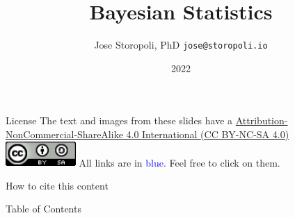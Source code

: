 \documentclass[aspectratio=169]{beamer}                    %
\title[Bayesian Statistics]{Bayesian Statistics}
\author{Jose Storopoli, PhD \texttt{jose@storopoli.io}}
\institute{}
\date{2022}
\begin{document}

\maketitle

\begingroup
\AtBeginSection[]{}

\endgroup

\begin{frame}{License}
	\centering
	\vfill
	\Large The text and images from these slides have a
	\href{https://creativecommons.org/licenses/by-nc-sa/4.0/deed.en}{Attribution-NonCommercial-ShareAlike 4.0 International (CC BY-NC-SA 4.0)}
	\vfill
	\includegraphics[width = 0.2\textwidth]{CC_SA.png}
	\vfill
	All links are in \textcolor{blue}{blue}.
	Feel free to click on them.
\end{frame}

\begin{frame}{How to cite this content}
	\centering
	\vfill
	\Large {}
	\vfill
\end{frame}

\setcounter{tocdepth}{1}
\begin{frame}{Table of Contents}
	\tableofcontents
\end{frame}

\end{document}
